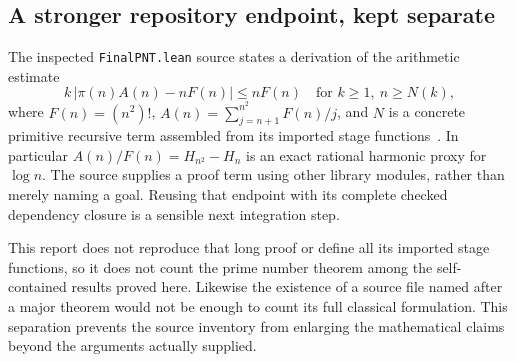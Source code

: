 \subsection{A stronger repository endpoint, kept separate}
The inspected \texttt{FinalPNT.lean} source states a derivation of the arithmetic estimate
\[
 k\,\bigl|\pi(n)A(n)-nF(n)\bigr|\le nF(n)
 \quad\text{for }k\ge1,\ n\ge N(k),
\]
where $F(n)=(n^2)!$, $A(n)=\sum_{j=n+1}^{n^2}F(n)/j$, and $N$ is a concrete primitive recursive term assembled from its imported stage functions~\cite{proveit-pnt}. In particular $A(n)/F(n)=H_{n^2}-H_n$ is an exact rational harmonic proxy for $\log n$. The source supplies a proof term using other library modules, rather than merely naming a goal. Reusing that endpoint with its complete checked dependency closure is a sensible next integration step.

This report does not reproduce that long proof or define all its imported stage functions, so it does not count the prime number theorem among the self-contained results proved here. Likewise the existence of a source file named after a major theorem would not be enough to count its full classical formulation. This separation prevents the source inventory from enlarging the mathematical claims beyond the arguments actually supplied.
